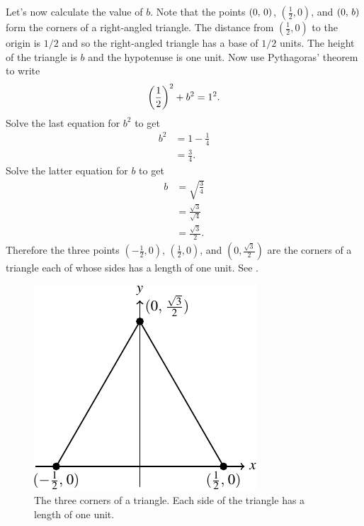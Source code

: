 \documentclass[a4paper,oneside,12pt]{article}
\begin{document}
\begin{problem}
{\begin{solution}
  Let's now calculate the value of $b$.  Note that the points
  $\tuple{0}{0}$, $(\frac{1}{2}\comma 0)$, and $\tuple{0}{b}$ form
  the corners of a right-angled triangle.  The distance from
  $(\frac{1}{2}\comma 0)$ to the origin is $1 / 2$ and so the
  right-angled triangle has a base of $1 / 2$ units.  The height of
  the triangle is $b$ and the hypotenuse is one unit.  Now use
  Pythagoras' theorem to write
  \[
  \parenthesis*{\frac{1}{2}}^2 + b^2
  =
  1^2.
  \]
  Solve the last equation for $b^2$ to get
  \begin{align*}
  b^2
  &=
  1 - \frac{1}{4} \\[4pt]
  &=
  \frac{3}{4}.
  \end{align*}
  Solve the latter equation for $b$ to get
  \begin{align*}
  b
  &=
  \sqrt{\frac{3}{4}} \\[4pt]
  &=
  \frac{\sqrt{3}}{\sqrt{4}} \\[4pt]
  &=
  \frac{\sqrt{3}}{2}.
  \end{align*}
  Therefore the three points $(-\frac{1}{2}\comma 0)$,
  $(\frac{1}{2}\comma 0)$, and $(0\comma \frac{\sqrt{3}}{2})$ are the
  corners of a triangle each of whose sides has a length of one unit.
  See .

  \begin{figure}[!htbp]
  \centering
  \includegraphics[scale=1.1]{image/03/unit-triangle.pdf}
  \caption{%
    The three corners of a triangle.  Each side of the triangle has a
    length of one unit.
  }
  \label{fig:unit_triangle}
  \end{figure}
  \end{solution}
}{}


\end{problem}
\end{document}
